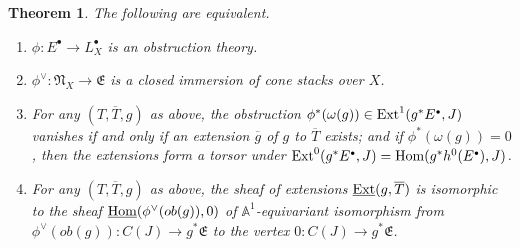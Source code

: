 \documentclass[11pt]{article}
\theoremstyle{plain}
\newtheorem{them}[prop]{Theorem}
\theoremstyle{definition}
\newcommand{\dual}[1]{{{#1}^{\vee}}}
\newcommand{\upst}{^{\ast}}
\newcommand{\com}{^{\scriptscriptstyle\bullet}}
\newcommand{\EE}{{\mathfrak{E}}}
\newcommand{\NN}{{\mathfrak{N}}}
\newcommand{\aaa}{{\mathbb{A}}}
\newcommand{\Hom}{\mathop{\rm Hom}\nolimits}
\newcommand{\Ext}{\mathop{\rm Ext}\nolimits}
\newcommand{\ol}{\overline}
\renewcommand{\ul}{\underline}
\providecommand{\Ext}{\operatorname{Ext}}
\theoremstyle{plain}
\theoremstyle{definition}
\theoremstyle{remark}
\begin{document}
\begin{them}\label{ontoh1}
The following are equivalent.
\begin{enumerate}
\item \label{ont1} \(\phi:E\com\to L_X\com\) is an obstruction theory.
\item \label{ont2}\(\dual{\phi}:\NN_X\to\EE\) is a closed immersion of
cone stacks over \(X\).
\item \label{ont3}For any \((T,\ol T, g)\) as above, the obstruction
\(\phi\upst(\omega(g))\in\Ext^1(g\upst E\com,J)\) vanishes if and only
if an extension \(\ol{g}\) of \(g\) to \(\ol T\) exists; and if
\(\phi\upst(\omega(g))=0\), then the extensions form a torsor under
\(\Ext^0(g\upst E\com,J)=\Hom(g\upst h^0(E\com),J)\).
\item \label{ont4}For any \((T,\ol T, g)\) as above, the sheaf of
extensions \(\ul{\Ext}(g,\ol T)\) is isomorphic to the sheaf
\(\ul{\Hom}(\dual{\phi}(ob(g)),0)\) of \(\aaa^1\)-equivariant
isomorphism from \(\dual{\phi}(ob(g)):C(J)\to g\upst\EE\)
to the vertex \(0:C(J)\to
g\upst \EE\).
\end{enumerate}
\end{them}
\end{document}

